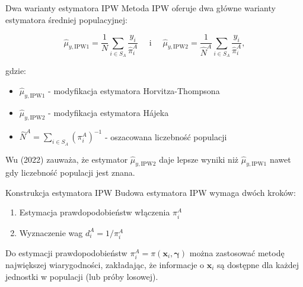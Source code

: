 \documentclass[10pt,ignorenonframetext, aspectratio=169]{beamer}
\newcommand{\bx}{\boldsymbol{x}}
\newcommand{\bgamma}{\boldsymbol{\gamma}}
\begin{document}
\begin{frame}{Dwa warianty estymatora IPW}
    Metoda IPW oferuje dwa główne warianty estymatora średniej populacyjnej:
    
    \begin{equation}
      \hat{\mu}_{y,\text{IPW1}}=\frac{1}{N} \sum_{i \in S_A} \frac{y_i}{\hat{\pi}_i^A} \quad \text { i } \quad 
      \hat{\mu}_{y,\text{IPW2}}=\frac{1}{\hat{N}^A} \sum_{i \in S_A} \frac{y_i}{\hat{\pi}_i^A},
    \end{equation}
    
    gdzie:
    \begin{itemize}
        \item $\hat{\mu}_{y,\text{IPW1}}$ - modyfikacja estymatora Horvitza-Thompsona
        \item $\hat{\mu}_{y,\text{IPW2}}$ - modyfikacja estymatora Hájeka
        \item $\hat{N}^A = \sum_{i \in S_A} (\pi_i^A)^{-1}$ - oszacowana liczebność populacji
    \end{itemize}
    
    \vspace{0.5em}
    \small{Wu (2022) zauważa, że estymator $\hat{\mu}_{y,\text{IPW2}}$ daje lepsze wyniki niż $\hat{\mu}_{y,\text{IPW1}}$ nawet gdy liczebność populacji jest znana.}
\end{frame}

\begin{frame}{Konstrukcja estymatora IPW}
    Budowa estymatora IPW wymaga dwóch kroków:
    
    \begin{enumerate}
        \item Estymacja prawdopodobieństw włączenia $\pi_i^A$
        \item Wyznaczenie wag $d_i^A = 1/\pi_i^A$
    \end{enumerate}
    
    \vspace{1em}
    
    Do estymacji prawdopodobieństw $\pi_i^A=\pi(\bx_i, \bgamma)$ można zastosować metodę największej wiarygodności, zakładając, że informacje o $\bx_i$ są dostępne dla każdej jednostki w populacji (lub próby losowej).
\end{frame}
\end{document}

